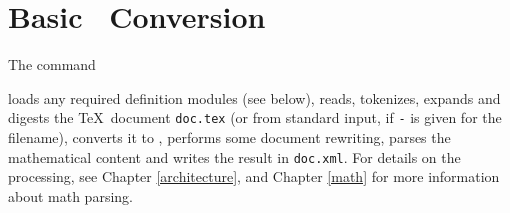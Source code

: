 \documentclass{book}
\begin{document}
\section[Conversion]{Basic \XML\ Conversion}\label{usage.conversion}
The command
\begin{quote}
\end{quote}
loads any required definition modules (see below),
reads, tokenizes, expands and digests the \TeX\ document \texttt{doc.tex}
(or from standard input, if \texttt{-} is given for the filename),
converts it to \XML,
performs some document rewriting, parses the mathematical content
and writes the result in \texttt{doc.xml}.
For details on the processing, see Chapter \ref{architecture},
and Chapter \ref{math} for more information about math parsing.
\end{document}
